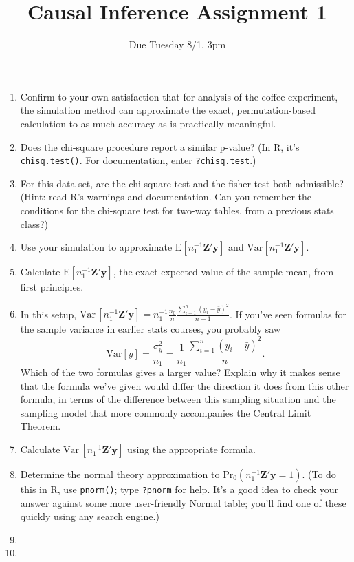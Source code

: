\documentclass{article}
\title{Causal Inference Assignment 1}
\author{Due Tuesday 8/1, 3pm}
\begin{document}
\maketitle

\begin{enumerate}
\item Confirm to your own satisfaction that for analysis of the coffee experiment, the simulation method can approximate the exact, permutation-based calculation to as much accuracy as is practically meaningful.
\item Does the chi-square procedure report a similar p-value?  (In R,
  it's \texttt{chisq.test()}. For documentation, enter \texttt{?chisq.test}.)
\item For this data set, are the chi-square test and the fisher test
  both admissible? (Hint: read R's warnings and documentation.  Can
  you remember the conditions for the chi-square test for two-way
  tables, from a previous stats class?)
\item Use your simulation to approximate $\mathrm{E} \left[n_{1}^{-1}\mathbf{Z}'\mathbf{y}\right] $ and
  $\mathrm{Var}\left[n_{1}^{-1}\mathbf{Z}'\mathbf{y}\right] $. 
\item Calculate $\mathrm{E}  \left[n_{1}^{-1}\mathbf{Z}'\mathbf{y}\right] $, the exact expected value of the
  sample mean, from first principles.  
\item In this setup, $\mathrm{Var}\, \left[n_{1}^{-1}\mathbf{Z}'\mathbf{y}\right]  = n_{1}^{-1}
  \frac{n_{0}}{n} \frac{\sum_{i=1}^{n} (y_{i} - \bar y)^{2}}{n-1} $.
  If you've seen formulas for the sample variance in earlier stats
  courses, you probably saw
  $$
  \mathrm{Var} \left[\bar{y}\right] = \frac{\sigma_{y}^{2}}{n_{1}} = \frac{1}{n_{1}}
  \frac{\sum_{i=1}^{n} (y_{i} - \bar y)^{2}}{n} .
  $$
Which of the two formulas gives a larger value?  Explain why it makes
sense that the formula we've given would differ the direction it does
from this other formula, in terms of the difference between this
sampling situation and the sampling model that more commonly
accompanies the Central Limit Theorem.
\item Calculate $ \mathrm{Var}\, \left[n_{1}^{-1}\mathbf{Z}'\mathbf{y}\right] $ using the appropriate
  formula. 
\item Determine the normal theory approximation to
  $\mathrm{Pr}_{0}(n_{1}^{-1}\mathbf{Z}'\mathbf{y} =1 ) $.  (To do this in R, use
  \texttt{pnorm()}; type \texttt{?pnorm} for help. It's a good idea to
  check your answer against some 
  more user-friendly Normal table; you'll find one of these quickly
  using any search engine.)
\item

\item

\end{enumerate}
\end{document}
